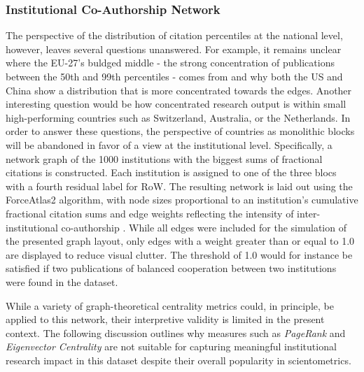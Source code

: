 \documentclass{article}
\begin{document}
	\subsubsection{Institutional Co-Authorship Network}
	\label{institution_network}
	The perspective of the distribution of citation percentiles at the national level, however, leaves several questions unanswered. For example, it remains unclear where the EU-27's buldged middle - the strong concentration of publications between the 50th and 99th percentiles - comes from and why both the US and China show a distribution that is more concentrated towards the edges. Another interesting question would be how concentrated research output is within small high-performing countries such as Switzerland, Australia, or the Netherlands. In order to answer these questions, the perspective of countries as monolithic blocks will be abandoned in favor of a view at the institutional level. Specifically, a network graph of the 1000 institutions with the biggest sums of fractional citations is constructed. Each institution is assigned to one of the three blocs with a fourth residual label for RoW. The resulting network is laid out using the ForceAtlas2 algorithm, with node sizes proportional to an institution’s cumulative fractional citation sums and edge weights reflecting the intensity of inter-institutional co-authorship \cite{jacomy2014forceatlas2}. While all edges were included for the simulation of the presented graph layout, only edges with a weight greater than or equal to 1.0 are displayed to reduce visual clutter. The threshold of 1.0 would for instance be satisfied if two publications of balanced cooperation between two institutions were found in the dataset.
	
	
	
	
	While a variety of graph-theoretical centrality metrics could, in principle, be applied to this network, their interpretive validity is limited in the present context. The following discussion outlines why measures such as \textit{PageRank} and \textit{Eigenvector Centrality} are not suitable for capturing meaningful institutional research impact in this dataset despite their overall popularity in scientometrics.
	
\end{document}
